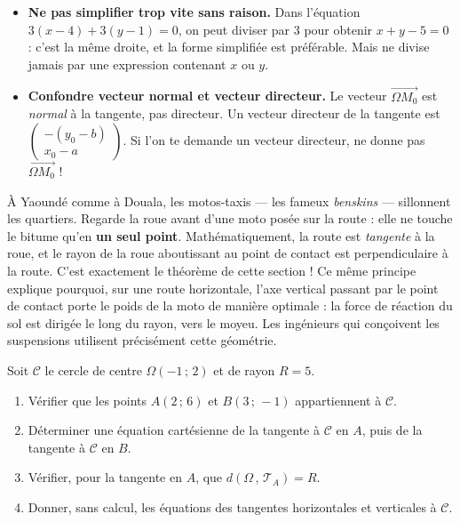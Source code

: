 \documentclass[11pt]{article}
\begin{document}
\begin{attention}
\begin{itemize}
\item \textbf{Ne pas simplifier trop vite sans raison.} Dans l'équation $3(x - 4) + 3(y - 1) = 0$, on peut diviser par $3$ pour obtenir $x + y - 5 = 0$ : c'est la même droite, et la forme simplifiée est préférable. Mais ne divise jamais par une expression contenant $x$ ou $y$.
\item \textbf{Confondre vecteur normal et vecteur directeur.} Le vecteur $\overrightarrow{\Omega M_0}$ est \emph{normal} à la tangente, pas directeur. Un vecteur directeur de la tangente est $\begin{pmatrix} -(y_0 - b) \\ x_0 - a \end{pmatrix}$. Si l'on te demande un vecteur directeur, ne donne pas $\overrightarrow{\Omega M_0}$ !
\end{itemize}
\end{attention}

\begin{savaistu}
À Yaoundé comme à Douala, les motos-taxis — les fameux \emph{benskins} — sillonnent les quartiers. Regarde la roue avant d'une moto posée sur la route : elle ne touche le bitume qu'en \textbf{un seul point}. Mathématiquement, la route est \emph{tangente} à la roue, et le rayon de la roue aboutissant au point de contact est perpendiculaire à la route. C'est exactement le théorème de cette section ! Ce même principe explique pourquoi, sur une route horizontale, l'axe vertical passant par le point de contact porte le poids de la moto de manière optimale : la force de réaction du sol est dirigée le long du rayon, vers le moyeu. Les ingénieurs qui conçoivent les suspensions utilisent précisément cette géométrie.
\end{savaistu}

\begin{exercice}
Soit $\mathcal{C}$ le cercle de centre $\Omega(-1\,;\,2)$ et de rayon $R = 5$.
\begin{enumerate}
\item Vérifier que les points $A(2\,;\,6)$ et $B(3\,;\,-1)$ appartiennent à $\mathcal{C}$.
\item Déterminer une équation cartésienne de la tangente à $\mathcal{C}$ en $A$, puis de la tangente à $\mathcal{C}$ en $B$.
\item Vérifier, pour la tangente en $A$, que $d(\Omega\,,\,\mathcal{T}_A) = R$.
\item Donner, sans calcul, les équations des tangentes horizontales et verticales à $\mathcal{C}$.
\end{enumerate}
\end{exercice}
\end{document}
